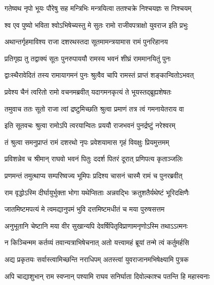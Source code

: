 
\twolineshloka
{गतेष्वथ नृपो भूयः पौरेषु सह मन्त्रिभिः}
{मन्त्रयित्वा ततश्चक्रे निश्चयज्ञः स निश्चयम्} %

\twolineshloka
{श्व एव पुष्यो भविता श्वोऽभिषेच्यस्तु मे सुतः}
{रामो राजीवपत्राक्षो युवराज इति प्रभुः} %

\twolineshloka
{अथान्तर्गृहमाविश्य राजा दशरथस्तदा}
{सूतमामन्त्रयामास रामं पुनरिहानय} %

\twolineshloka
{प्रतिगृह्य तु तद्वाक्यं सूतः पुनरुपाययौ}
{रामस्य भवनं शीघ्रं राममानयितुं पुनः} %

\twolineshloka
{द्वाःस्थैरावेदितं तस्य रामायागमनं पुनः}
{श्रुत्वैव चापि रामस्तं प्राप्तं शङ्कान्वितोऽभवत्} %

\twolineshloka
{प्रवेश्य चैनं त्वरितो रामो वचनमब्रवीत्}
{यदागमनकृत्यं ते भूयस्तद्ब्रूह्यशेषतः} %

\twolineshloka
{तमुवाच ततः सूतो राजा त्वां द्रष्टुमिच्छति}
{श्रुत्वा प्रमाणं तत्र त्वं गमनायेतराय वा} %

\twolineshloka
{इति सूतवचः श्रुत्वा रामोऽपि त्वरयान्वितः}
{प्रययौ राजभवनं पुनर्द्रष्टुं नरेश्वरम्} %

\twolineshloka
{तं श्रुत्वा समनुप्राप्तं रामं दशरथो नृपः}
{प्रवेशयामास गृहं विवक्षुः प्रियमुत्तमम्} %

\twolineshloka
{प्रविशन्नेव च श्रीमान् राघवो भवनं पितुः}
{ददर्श पितरं दूरात् प्रणिपत्य कृताञ्जलिः} %

\twolineshloka
{प्रणमन्तं तमुत्थाप्य सम्परिष्वज्य भूमिपः}
{प्रदिश्य चासनं चास्मै रामं च पुनरब्रवीत्} %

\twolineshloka
{राम वृद्धोऽस्मि दीर्घायुर्भुक्ता भोगा यथेप्सिताः}
{अन्नवद्भिः क्रतुशतैर्यथेष्टं भूरिदक्षिणैः} %

\twolineshloka
{जातमिष्टमपत्यं मे त्वमद्यानुपमं भुवि}
{दत्तमिष्टमधीतं च मया पुरुषसत्तम} %

\twolineshloka
{अनुभूतानि चेष्टानि मया वीर सुखान्यपि}
{देवर्षिपितृविप्राणामनृणोऽस्मि तथाऽऽत्मनः} %

\twolineshloka
{न किञ्चिन्मम कर्तव्यं तवान्यत्राभिषेचनात्}
{अतो यत्त्वामहं ब्रूयां तन्मे त्वं कर्तुमर्हसि} %

\twolineshloka
{अद्य प्रकृतयः सर्वास्त्वामिच्छन्ति नराधिपम्}
{अतस्त्वां युवराजानमभिषेक्ष्यामि पुत्रक} %

\twolineshloka
{अपि चाद्याशुभान् राम स्वप्नान् पश्यामि राघव}
{सनिर्घाता दिवोल्काश्च पतन्ति हि महास्वनाः} %

